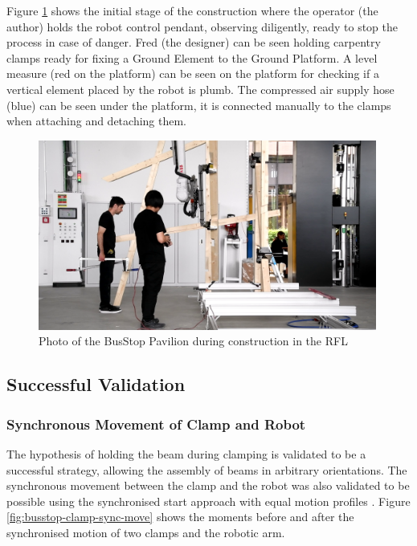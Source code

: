 Figure \ref{fig:photo-busstop-assembly-in-rfl} shows the initial stage of the construction where the operator (the author) holds the robot control pendant, observing diligently, ready to stop the process in case of danger. Fred (the designer) can be seen holding carpentry clamps ready for fixing a Ground Element to the Ground Platform. A level measure (red on the platform) can be seen on the platform for checking if a vertical element placed by the robot is plumb. The compressed air supply hose (blue) can be seen under the platform, it is connected manually to the clamps when attaching and detaching them.

\begin{figure}
    \centering
    \includegraphics[width=0.99\textwidth]{images/05/image116.png}
    \caption{Photo of the BusStop Pavilion during construction in the RFL}
    \label{fig:photo-busstop-assembly-in-rfl}
\end{figure}


\subsection{Successful Validation}
\label{subsection:exploration-2-successful-validation}

\subsubsection{Synchronous Movement of Clamp and Robot}
\label{subsubsection:exploration-2-syncronous-movement-of-clamp-and-robot}

The hypothesis of holding the beam during clamping  is validated to be a successful strategy, allowing the assembly of beams in arbitrary orientations. The synchronous movement between the clamp and the robot was also validated to be possible using the synchronised start approach with equal motion profiles . Figure \ref{fig:busstop-clamp-sync-move} shows the moments before and after the synchronised motion of two clamps and the robotic arm.

